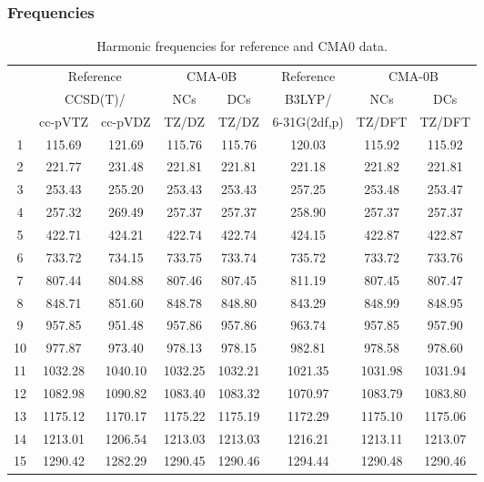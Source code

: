 \documentclass[10pt,oneside]{article}
\begin{document}
\subsubsection*{Frequencies}
\begin{table}[h!]
\centering
\caption{Harmonic frequencies for reference and CMA0 data.}
\begin{tabular}{cccccccc}
\toprule
{} & \multicolumn{2}{c}{Reference} & \multicolumn{2}{c}{CMA-0B} &    Reference & \multicolumn{2}{c}{CMA-0B} \\
{} & \multicolumn{2}{c}{CCSD(T)/} &     NCs &     DCs &       B3LYP/ &     NCs &     DCs \\
{} &   cc-pVTZ & cc-pVDZ &   TZ/DZ &   TZ/DZ & 6-31G(2df,p) &  TZ/DFT &  TZ/DFT \\
\midrule
1  &    115.69 &  121.69 &  115.76 &  115.76 &       120.03 &  115.92 &  115.92 \\
2  &    221.77 &  231.48 &  221.81 &  221.81 &       221.18 &  221.82 &  221.81 \\
3  &    253.43 &  255.20 &  253.43 &  253.43 &       257.25 &  253.48 &  253.47 \\
4  &    257.32 &  269.49 &  257.37 &  257.37 &       258.90 &  257.37 &  257.37 \\
5  &    422.71 &  424.21 &  422.74 &  422.74 &       424.15 &  422.87 &  422.87 \\
6  &    733.72 &  734.15 &  733.75 &  733.74 &       735.72 &  733.72 &  733.76 \\
7  &    807.44 &  804.88 &  807.46 &  807.45 &       811.19 &  807.45 &  807.47 \\
8  &    848.71 &  851.60 &  848.78 &  848.80 &       843.29 &  848.99 &  848.95 \\
9  &    957.85 &  951.48 &  957.86 &  957.86 &       963.74 &  957.85 &  957.90 \\
10 &    977.87 &  973.40 &  978.13 &  978.15 &       982.81 &  978.58 &  978.60 \\
11 &   1032.28 & 1040.10 & 1032.25 & 1032.21 &      1021.35 & 1031.98 & 1031.94 \\
12 &   1082.98 & 1090.82 & 1083.40 & 1083.32 &      1070.97 & 1083.79 & 1083.80 \\
13 &   1175.12 & 1170.17 & 1175.22 & 1175.19 &      1172.29 & 1175.10 & 1175.06 \\
14 &   1213.01 & 1206.54 & 1213.03 & 1213.03 &      1216.21 & 1213.11 & 1213.07 \\
15 &   1290.42 & 1282.29 & 1290.45 & 1290.46 &      1294.44 & 1290.48 & 1290.46 \\

\end{tabular}
\end{table}
\end{document}
